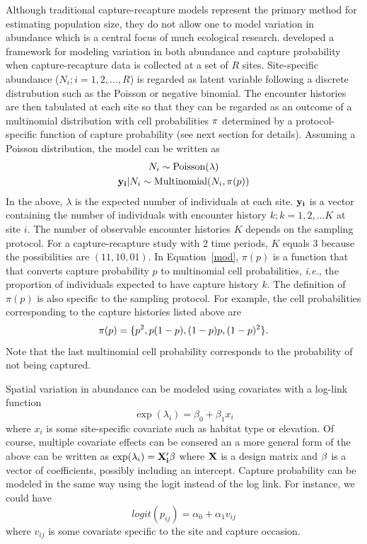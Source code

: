 \documentclass[a4paper]{article}
\begin{document}
Although traditional capture-recapture models represent the primary
method for estimating population size, they do not allow one to model
variation in abundance which is a central focus of much ecological
research.
\citet{royle_generalized_2004} developed a framework for
modeling variation in both abundance and capture
probability when capture-recapture data is collected at a set of
$R$ sites. Site-specific abundance ($N_i; i=1,2,...,R$) is regarded
as latent variable following a discrete distrubution such as the
Poisson or negative binomial. The encounter histories are then
tabulated at each site so that they can be regarded as an outcome of a
multinomial distribution with cell probabilities {$\bold \pi$}
determined by a protocol-specific function of capture
probability (see next section for details). Assuming a Poisson
distribution, the model can be written as
\begin{gather}
  N_i \sim \mbox{Poisson}(\lambda) \nonumber \\
  {\bf y_i}|N_i \sim \mbox{Multinomial}(N_i, \pi(p))
  \label{mod}
\end{gather}
In the above, $\lambda$ is the expected number of individuals at each
site. ${\bf y_i}$ is a vector containing the number of
individuals with encounter history $k; k=1,2,...K$ at site $i$. The
number of observable encounter histories $K$ depends on the sampling
protocol. For a capture-recapture study with 2 time periods, $K$
equals 3 because the possibilities are $(11, 10, 01)$. In Equation~\ref{mod},
$\pi(p)$ is a function that that converts capture probability $p$ to
multinomial cell probabilities, \emph{i.e.}, the proportion
of individuals expected to have capture history $k$. The definition of
$\pi(p)$ is also specific to the sampling protocol. For example, the
cell probabilities corresponding to the capture histories listed above
are
\[
{\bold \pi(p)} = \{p^2, p(1-p), (1-p)p, (1-p)^2\}.
\]
Note that the last multinomial cell probability corresponds to the
probability of not being captured.

Spatial variation in abundance can be modeled using covariates
with a log-link function
\[
\exp(\lambda_i) = \beta_0 + \beta_1 x_i
\]
where $x_i$ is some site-specific covariate such as habitat type or
elevation. Of course, multiple covariate effects can be consered an a
more general form of the above can be written as $\exp(\lambda_i) =
{\bf X_i' \beta}$ where ${\bf X}$ is a design matrix and ${\bf \beta}$ is a vector
of coefficients, possibly including an intercept.
Capture probability can be modeled in the same way using the logit
instead of the log link. For instance, we could have
\[
logit(p_{ij}) = \alpha_0 + \alpha_1 v_{ij}
\]
where $v_{ij}$ is some covariate specific to the site and
capture occasion.
\end{document}
